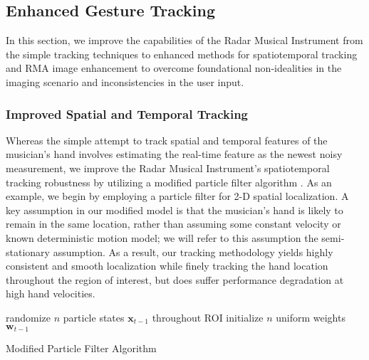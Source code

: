 \documentclass[10pt,journal,final]{IEEEtran}
\begin{document}
\subsection{Enhanced Gesture Tracking}
\label{subsec:enhanced_gesture_tracking}
In this section, we improve the capabilities of the Radar Musical Instrument from the simple tracking techniques to enhanced methods for spatiotemporal tracking and RMA image enhancement to overcome foundational non-idealities in the imaging scenario and inconsistencies in the user input.

\subsubsection{Improved Spatial and Temporal Tracking}
\label{subsubsec:improved_spatial_and_temporal_tracking}
Whereas the simple attempt to track spatial and temporal features of the musician's hand involves estimating the real-time feature as the newest noisy measurement, we improve the Radar Musical Instrument's spatiotemporal tracking robustness by utilizing a modified particle filter algorithm \cite{tracking:condensation_algorithm_radar}. As an example, we begin by employing a particle filter for 2-D spatial localization. A key assumption in our modified model is that the musician's hand is likely to remain in the same location, rather than assuming some constant velocity or known deterministic motion model; we will refer to this assumption the semi-stationary assumption. As a result, our tracking methodology yields highly consistent and smooth localization while finely tracking the hand location throughout the region of interest, but does suffer performance degradation at high hand velocities.

\begin{algorithm}[h]
	\label{algo:particle_filter}
	\SetAlgoLined
	randomize $n$ particle states $\bm{x}_{t-1}$ throughout ROI\;
	initialize $n$ uniform weights $\bm{w}_{t-1}$\;
	\caption{Modified Particle Filter Algorithm}
\end{algorithm}
\end{document}
